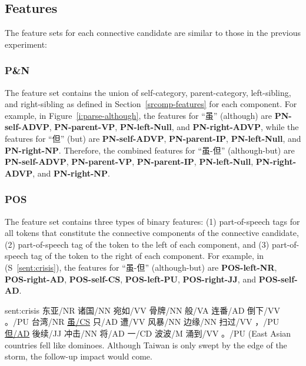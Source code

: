 \subsection{Features}

The feature sets for each connective candidate are similar to those in the previous
experiment:

\subsubsection{P\&N}

The feature set contains the union of self-category, parent-category, left-sibling,
and right-sibling as defined in Section~\ref{srcomp-features} for each component.
For example, in Figure~\ref{i:parse-although}, the features for ``虽'' (although) are
\textbf{PN-self-ADVP}, \textbf{PN-parent-VP}, \textbf{PN-left-Null}, and \textbf{PN-right-ADVP}, while
the features for ``但'' (but) are \textbf{PN-self-ADVP}, \textbf{PN-parent-IP}, \textbf{PN-left-Null},
and \textbf{PN-right-NP}. Therefore, the combined features for ``虽-但'' (although-but) are
\textbf{PN-self-ADVP}, \textbf{PN-parent-VP}, \textbf{PN-parent-IP}, \textbf{PN-left-Null},
\textbf{PN-right-ADVP}, and \textbf{PN-right-NP}.





\subsubsection{POS}

The feature set contains three types of binary features:
(1) part-of-speech tags for all tokens that constitute the connective components
of the connective candidate,
(2) part-of-speech tag of the token to the left of each component, and
(3) part-of-speech tag of the token to the right of each component. For example,
in (S~\ref{sent:crisis}), the features for ``虽-但'' (although-but) are
\textbf{POS-left-NR}, \textbf{POS-right-AD}, \textbf{POS-self-CS},
\textbf{POS-left-PU}, \textbf{POS-right-JJ}, and \textbf{POS-self-AD}.

\begin{sent}{sent:crisis}{}
    东亚/NR 诸国/NN 宛如/VV 骨牌/NN 般/VA 连番/AD 倒下/VV 。/PU
    台湾/NR \underline{虽/CS} 只/AD 遭/VV 风暴/NN 边缘/NN 扫过/VV ，/PU
    \underline{但/AD} 後续/JJ 冲击/NN 将/AD 一/CD 波波/M 涌到/VV 。/PU
    (East Asian countries fell like dominoes.
    Although Taiwan is only swept by the edge of the storm,
    the follow-up impact would come.
\end{sent}

